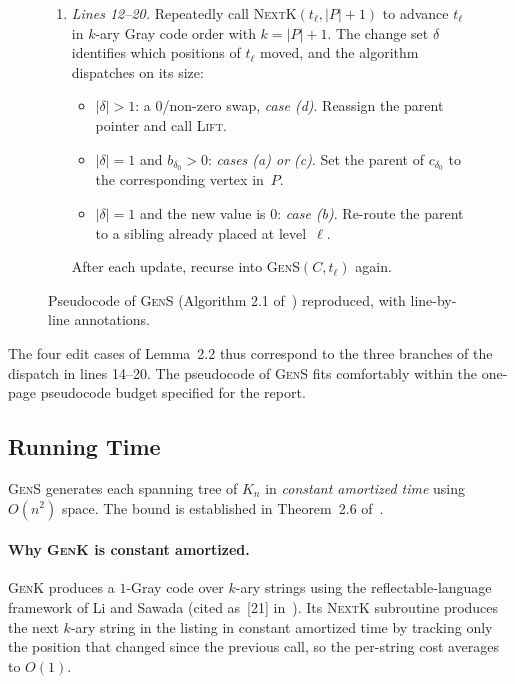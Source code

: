 \documentclass{article}
\begin{document}
\begin{figure}[H]
\begin{minipage}[t]{0.66\linewidth}
\begin{enumerate}
            \item \emph{Lines 12--20.} Repeatedly call \textsc{NextK}$(t_\ell, |P|+1)$ to advance $t_\ell$ in $k$-ary Gray code order with $k=|P|+1$. The change set $\delta$ identifies which positions of $t_\ell$ moved, and the algorithm dispatches on its size:
            \begin{itemize}
                \item $|\delta|>1$: a $0$/non-zero swap, \emph{case (d)}. Reassign the parent pointer and call \textsc{Lift}.
                \item $|\delta|=1$ and $b_{\delta_0}>0$: \emph{cases (a) or (c)}. Set the parent of $c_{\delta_0}$ to the corresponding vertex in~$P$.
                \item $|\delta|=1$ and the new value is $0$: \emph{case (b)}. Re-route the parent to a sibling already placed at level~$\ell$.
            \end{itemize}
            After each update, recurse into \textsc{GenS}$(C, t_\ell)$ again.
        \end{enumerate}
    \end{minipage}
    \caption{Pseudocode of \textsc{GenS} (Algorithm 2.1 of~\cite{liu2026}) reproduced, with line-by-line annotations.}
    \label{fig:gens-pseudocode}
\end{figure}

The four edit cases of Lemma~2.2 thus correspond to the three branches of the dispatch in lines 14--20. The pseudocode of \textsc{GenS} fits comfortably within the one-page pseudocode budget specified for the report.

\subsection{Running Time}

\textsc{GenS} generates each spanning tree of $K_n$ in \emph{constant amortized time} using $O(n^2)$ space. The bound is established in Theorem~2.6 of~\cite{liu2026}.

\paragraph{Why \textsc{GenK} is constant amortized.}
\textsc{GenK} produces a $1$-Gray code over $k$-ary strings using the reflectable-language framework of Li and Sawada (cited as~[21] in~\cite{liu2026}). Its \textsc{NextK} subroutine produces the next $k$-ary string in the listing in constant amortized time by tracking only the position that changed since the previous call, so the per-string cost averages to $O(1)$.
\end{document}
